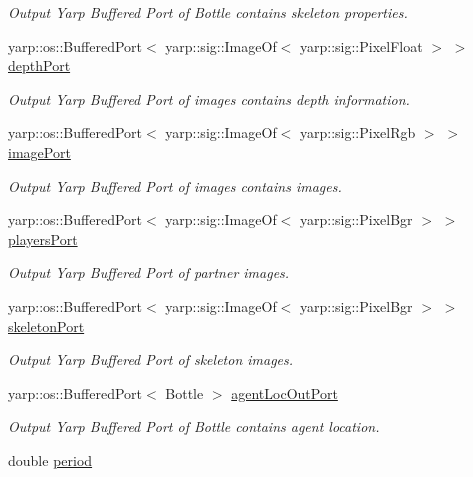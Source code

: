 \begin{DoxyCompactItemize}
\begin{DoxyCompactList}\small\item\em Output Yarp Buffered Port of Bottle contains skeleton properties. \end{DoxyCompactList}\item 
yarp\+::os\+::\+Buffered\+Port$<$ yarp\+::sig\+::\+Image\+Of$<$ yarp\+::sig\+::\+Pixel\+Float $>$ $>$ \hyperlink{group__agentDetector_af0e69945340f969d71c0e1cf3b7dbc2b}{depth\+Port}
\begin{DoxyCompactList}\small\item\em Output Yarp Buffered Port of images contains depth information. \end{DoxyCompactList}\item 
yarp\+::os\+::\+Buffered\+Port$<$ yarp\+::sig\+::\+Image\+Of$<$ yarp\+::sig\+::\+Pixel\+Rgb $>$ $>$ \hyperlink{group__agentDetector_a10140a4002c6bb0c2e7cc5e762d4ad6c}{image\+Port}
\begin{DoxyCompactList}\small\item\em Output Yarp Buffered Port of images contains images. \end{DoxyCompactList}\item 
yarp\+::os\+::\+Buffered\+Port$<$ yarp\+::sig\+::\+Image\+Of$<$ yarp\+::sig\+::\+Pixel\+Bgr $>$ $>$ \hyperlink{group__agentDetector_ab6de38a8d44bdebe0007e411dddb0e9a}{players\+Port}
\begin{DoxyCompactList}\small\item\em Output Yarp Buffered Port of partner images. \end{DoxyCompactList}\item 
yarp\+::os\+::\+Buffered\+Port$<$ yarp\+::sig\+::\+Image\+Of$<$ yarp\+::sig\+::\+Pixel\+Bgr $>$ $>$ \hyperlink{group__agentDetector_a3f23450351feb8d52896a7b321343a93}{skeleton\+Port}
\begin{DoxyCompactList}\small\item\em Output Yarp Buffered Port of skeleton images. \end{DoxyCompactList}\item 
yarp\+::os\+::\+Buffered\+Port$<$ Bottle $>$ \hyperlink{group__agentDetector_abf1d4495bc0e3521788c73b526704ac4}{agent\+Loc\+Out\+Port}
\begin{DoxyCompactList}\small\item\em Output Yarp Buffered Port of Bottle contains agent location. \end{DoxyCompactList}\item 
double \hyperlink{group__agentDetector_a6fe92037066cc5b2c59506897ddef375}{period}

\end{DoxyCompactItemize}
